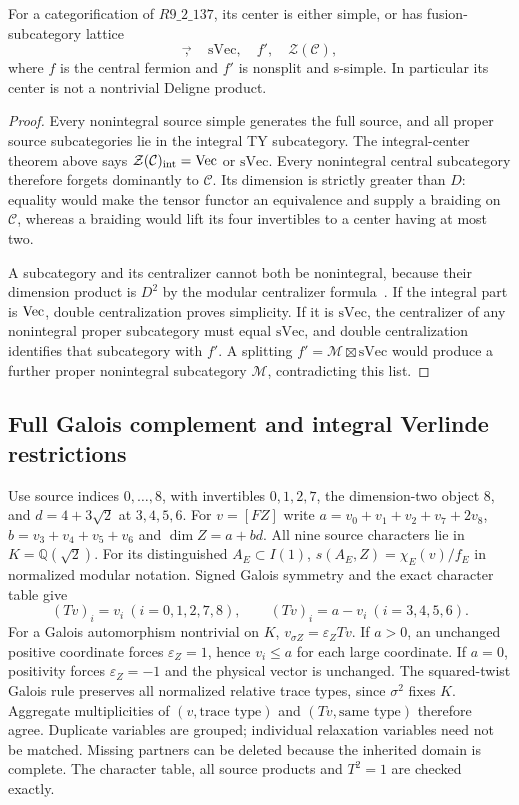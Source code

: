 \begin{proposition}
For a categorification of $R9\_2\_137$, its center is either simple,
or has fusion-subcategory lattice
\[
 \Vec,\quad \mathrm{sVec},\quad f',\quad \mathcal Z(\mathcal C),
\]
where $f$ is the central fermion and $f'$ is nonsplit and s-simple.
In particular its center is not a nontrivial Deligne product.
\end{proposition}
\begin{proof}
Every nonintegral source simple generates the full source, and all
proper source subcategories lie in the integral TY subcategory.
The integral-center theorem above says
$\mathcal Z(\mathcal C)_{\rm int}=\Vec$ or $\mathrm{sVec}$.
Every nonintegral central subcategory therefore forgets dominantly
to $\mathcal C$. Its dimension is strictly greater than $D$:
equality would make the tensor functor an equivalence and supply a
braiding on $\mathcal C$, whereas a braiding would lift its four
invertibles to a center having at most two.

A subcategory and its centralizer cannot both be nonintegral,
because their dimension product is $D^2$ by the modular centralizer
formula~\cite{DGNO}. If the integral part is $\Vec$, double
centralization proves simplicity. If it is $\mathrm{sVec}$,
the centralizer of any nonintegral proper subcategory must equal
$\mathrm{sVec}$, and double centralization identifies that
subcategory with $f'$. A splitting $f'=\mathcal M\boxtimes\mathrm{sVec}$
would produce a further proper nonintegral subcategory $\mathcal M$,
contradicting this list.
\end{proof}


\subsection{Full Galois complement and integral Verlinde restrictions}
\label{sec:r137-integral-verlinde}
Use source indices $0,\ldots,8$, with invertibles $0,1,2,7$, the
dimension-two object $8$, and $d=4+3\sqrt2$ at $3,4,5,6$.
For $v=[FZ]$ write $a=v_0+v_1+v_2+v_7+2v_8$,
$b=v_3+v_4+v_5+v_6$ and $\dim Z=a+bd$.
All nine source characters lie in $K=\mathbb Q(\sqrt2)$.
For its distinguished $A_E\subset I(1)$,
$s(A_E,Z)=\chi_E(v)/f_E$ in normalized modular notation.
Signed Galois symmetry and the exact character table give
\[
 (Tv)_i=v_i\ (i=0,1,2,7,8),\qquad
 (Tv)_i=a-v_i\ (i=3,4,5,6).
\]
For a Galois automorphism nontrivial on $K$,
$v_{\sigma Z}=\varepsilon_Z Tv$. If $a>0$, an unchanged positive
coordinate forces $\varepsilon_Z=1$, hence $v_i\le a$ for each large
coordinate. If $a=0$, positivity forces $\varepsilon_Z=-1$ and the
physical vector is unchanged. The squared-twist Galois rule preserves
all normalized relative trace types, since $\sigma^2$ fixes $K$.
Aggregate multiplicities of $(v,\text{trace type})$ and
$(Tv,\text{same type})$ therefore agree. Duplicate variables are grouped;
individual relaxation variables need not be matched. Missing partners
can be deleted because the inherited domain is complete.
The character table, all source products and $T^2=1$ are checked exactly.

